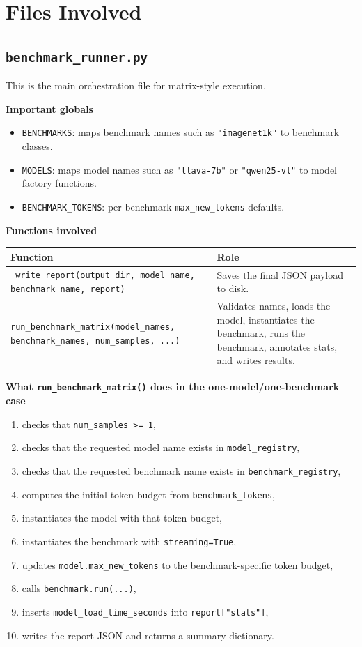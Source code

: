 \documentclass[11pt]{article}
\begin{document}
\section{Files Involved}

\subsection*{\texttt{benchmark\_runner.py}}
This is the main orchestration file for matrix-style execution.

\textbf{Important globals}
\begin{itemize}[leftmargin=*]
    \item \texttt{BENCHMARKS}: maps benchmark names such as \texttt{"imagenet1k"} to benchmark classes.
    \item \texttt{MODELS}: maps model names such as \texttt{"llava-7b"} or \texttt{"qwen25-vl"} to model factory functions.
    \item \texttt{BENCHMARK\_TOKENS}: per-benchmark \texttt{max\_new\_tokens} defaults.
\end{itemize}

\textbf{Functions involved}
\begin{longtable}{>{\ttfamily}p{}p{}}
\textnormal{Function} & \textnormal{Role} \\
\hline
\texttt{\_write\_report(output\_dir, model\_name, benchmark\_name, report)} & Saves the final JSON payload to disk. \\
\texttt{run\_benchmark\_matrix(model\_names, benchmark\_names, num\_samples, ...)} & Validates names, loads the model, instantiates the benchmark, runs the benchmark, annotates stats, and writes results. \\
\end{longtable}

\textbf{What \texttt{run\_benchmark\_matrix()} does in the one-model/one-benchmark case}
\begin{enumerate}[label=\arabic*.]
    \item checks that \texttt{num\_samples >= 1},
    \item checks that the requested model name exists in \texttt{model\_registry},
    \item checks that the requested benchmark name exists in \texttt{benchmark\_registry},
    \item computes the initial token budget from \texttt{benchmark\_tokens},
    \item instantiates the model with that token budget,
    \item instantiates the benchmark with \texttt{streaming=True},
    \item updates \texttt{model.max\_new\_tokens} to the benchmark-specific token budget,
    \item calls \texttt{benchmark.run(...)},
    \item inserts \texttt{model\_load\_time\_seconds} into \texttt{report["stats"]},
    \item writes the report JSON and returns a summary dictionary.
\end{enumerate}
\end{document}
